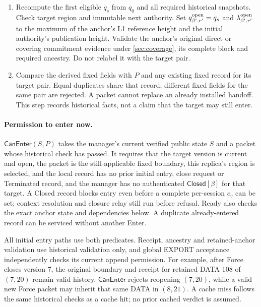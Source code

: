 \documentclass[11pt,a4paper]{article}
\newcommand{\tagg}[1]{\ensuremath{\mathsf{#1}}}
\begin{document}
\begin{enumerate}[label=(\roman*),itemsep=2pt]
anchor equality with pre-payload $G$, including prefix provenance.
During an unassigned interval, verify the stored context and any
intervening Forces rather than inventing an empty export session.
A later Force supersedes this boundary for future activation, but does
not invalidate its historical cause, original selection or retained anchor.
\item Recompute the first eligible $q_s$ from $q_0$ and all required
historical snapshots. Check target region and immutable next authority.
Set $q^{\rm open}_{\beta',r'}=q_s$ and
$\lambda^{\rm open}_{\beta',r'}$ to the maximum of the anchor's L1
reference height and the initial authority's publication height.
Validate the anchor's original direct or covering commitment evidence
under \cref{sec:coverage}, its complete block and required ancestry.
Do not relabel it with the target pair.
\item Compare the derived fixed fields with $P$ and any existing
fixed record for its target pair. Equal duplicates share that record;
different fixed fields for the same pair are rejected. A packet cannot
replace an already installed handoff. This step records historical facts,
not a claim that the target may still enter.
\end{enumerate}

\paragraph{Permission to enter now.}
\label{sec:can-enter}
$\tagg{CanEnter}(S,P)$ takes the manager's current verified public state
$S$ and a packet whose historical check has passed. It requires that the
target version is current and open, the packet is the still-applicable
fixed boundary, this replica's region is selected, and the local record
has no prior initial entry, close request or Terminated record, and the
manager has no authenticated $\tagg{Closed}[\beta]$ for that target.
A Closed record blocks entry even before a complete per-session $c_v$
can be set; context resolution and closure relay still run before refusal. Ready
also checks the exact anchor state and dependencies below. A duplicate
already-entered record can be serviced without another Enter.

All initial entry paths use both predicates. Receipt, ancestry and
retained-anchor validation use historical validation only, and global
EXPORT acceptance independently checks its current append permission.
For example, after Force closes version 7, the original boundary and
receipt for retained DATA 108 of $(7,20)$ remain valid history.
$\tagg{CanEnter}$ rejects reopening $(7,20)$, while a valid new Force
packet may inherit that same DATA in $(8,21)$. A cache miss follows the
same historical checks as a cache hit; no prior cached verdict is assumed.
\end{document}
